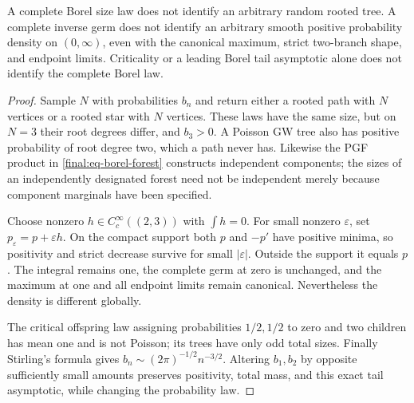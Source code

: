 \begin{proposition}
\label{final:P6-boundaries}
A complete Borel size law does not identify an arbitrary random
rooted tree.  A complete inverse germ does not identify an arbitrary
smooth positive probability density on $(0,\infty)$, even with the
canonical maximum, strict two-branch shape, and endpoint limits.
Criticality or a leading Borel tail asymptotic alone does not
identify the complete Borel law.
\end{proposition}
\begin{proof}
Sample $N$ with probabilities $b_n$ and return either a rooted path
with $N$ vertices or a rooted star with $N$ vertices.  These laws
have the same size, but on $N=3$ their root degrees differ, and
$b_3>0$.  A Poisson GW tree also has positive probability of root
degree two, which a path never has.  Likewise the PGF product in
\eqref{final:eq-borel-forest} constructs independent components;
the sizes of an independently designated forest need not be
independent merely because component marginals have been specified.

Choose nonzero $h\in C_c^\infty((2,3))$ with $\int h=0$.
For small nonzero $\varepsilon$, set $p_\varepsilon=p+\varepsilon h$.
On the compact support both $p$ and $-p'$ have positive minima,
so positivity and strict decrease survive for small $|\varepsilon|$.
Outside the support it equals $p$.  The integral remains one, the
complete germ at zero is unchanged, and the maximum at one and
all endpoint limits remain canonical.  Nevertheless the density
is different globally.

The critical offspring law assigning probabilities $1/2,1/2$ to
zero and two children has mean one and is not Poisson; its trees
have only odd total sizes.  Finally Stirling's formula gives
$b_n\sim(2\pi)^{-1/2}n^{-3/2}$.  Altering $b_1,b_2$ by opposite
sufficiently small amounts preserves positivity, total mass, and
this exact tail asymptotic, while changing the probability law.
\end{proof}

